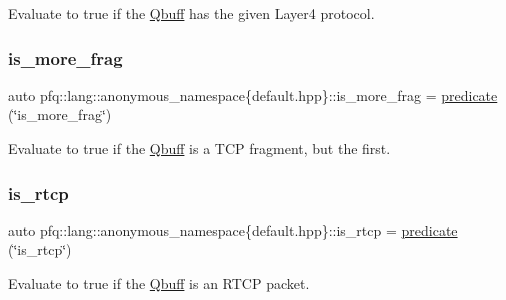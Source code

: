 Evaluate to {\ttfamily true} if the \hyperlink{structpfq_1_1lang_1_1Qbuff}{Qbuff} has the given Layer4 protocol. 

\mbox{\label{namespacepfq_1_1lang_1_1anonymous__namespace_02default_8hpp_03_a0b169afb2f21c8626f06f77ca75feded}} 
\subsubsection{\texorpdfstring{is\+\_\+more\+\_\+frag}{is\_more\_frag}}
{\footnotesize\ttfamily auto pfq\+::lang\+::anonymous\+\_\+namespace\{default.\+hpp\}\+::is\+\_\+more\+\_\+frag = \hyperlink{namespacepfq_1_1lang_aca9adafc436b7f851621b979fa1aaf88}{predicate} (\char`\"{}is\+\_\+more\+\_\+frag\char`\"{})}



Evaluate to {\ttfamily true} if the \hyperlink{structpfq_1_1lang_1_1Qbuff}{Qbuff} is a T\+CP fragment, but the first. 

\mbox{\label{namespacepfq_1_1lang_1_1anonymous__namespace_02default_8hpp_03_a2cbe73f955007e35d4a627c2cfb38566}} 
\subsubsection{\texorpdfstring{is\+\_\+rtcp}{is\_rtcp}}
{\footnotesize\ttfamily auto pfq\+::lang\+::anonymous\+\_\+namespace\{default.\+hpp\}\+::is\+\_\+rtcp = \hyperlink{namespacepfq_1_1lang_aca9adafc436b7f851621b979fa1aaf88}{predicate} (\char`\"{}is\+\_\+rtcp\char`\"{})}



Evaluate to {\ttfamily true} if the \hyperlink{structpfq_1_1lang_1_1Qbuff}{Qbuff} is an R\+T\+CP packet. 

